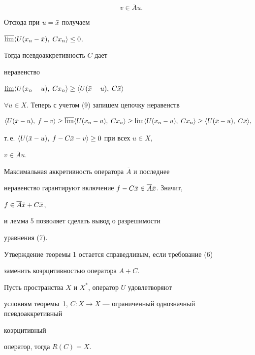 \begin{pf}
\begin{equation}
\quad v\in\overline Au. 


\end{equation} 


Отсюда при $u=\Bar x$ получаем 


$\overline{\lim}\langle U(x_n-\Bar x),\;Cx_n\rangle\le 0$. 


Тогда псевдоаккретивность $C$ дает 


неравенство 


$\underline{\lim}\langle U(x_n-u),\;Cx_n\rangle\ge\langle U(\Bar x-u),\;C\Bar x\rangle$ 


$\forall u\in X$. Теперь с учетом (9) запишем цепочку неравенств 


\begin{equation} 


\la U(\Bar x-u),\;f-v\ra \ge \overline{\lim}\la U(x_n-u),\;Cx_n\ra\ge 


\underline{\lim}\la U(x_n-u),\;Cx_n\ra\ge 


\la U(\Bar x-u),\;C\Bar x\ra , 


\end{equation} 


т.\,е. $\langle U(\Bar x-u),\;f-C\Bar x-v\rangle\ge 0$ при всех $u\in X$, 


$v\in \overline Au$. 


Максимальная аккретивность оператора $\overline A$ и последнее 


неравенство гарантируют включение $f-C\Bar x\in\overline A\Bar x$. Значит, 


$f\in\overline A\Bar x+C\Bar x$,


и лемма 5 позволяет сделать вывод о разрешимости 


уравнения (7). 


\end{pf} 


 


\begin{cor} Утверждение теоремы 1 остается справедливым, если требование (6) 


заменить коэрцитивностью оператора $\overline A+C$. 


\end{cor} 


 


\begin{cor} Пусть пространства $X$ и $X^*$, оператор $U$ удовлетворяют 


условиям теоремы~1, $C:X\to X$ --- ограниченный однозначный псевдоаккретивный 


коэрцитивный 


оператор, тогда $R(C)=X$. 


\end{cor} 


